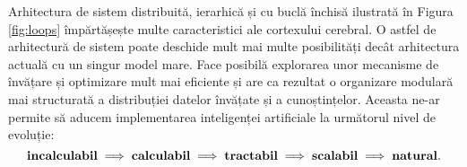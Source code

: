 \documentclass[../../book-main_ro.tex]{subfiles}
\begin{document}
Arhitectura de sistem distribuită, ierarhică și cu buclă închisă ilustrată în Figura \ref{fig:loops} împărtășește multe caracteristici ale cortexului cerebral. O astfel de arhitectură de sistem poate deschide mult mai multe posibilități decât arhitectura actuală cu un singur model mare. Face posibilă explorarea unor mecanisme de învățare și optimizare mult mai eficiente și are ca rezultat o organizare modulară mai structurată a distribuției datelor învățate și a cunoștințelor. Aceasta ne-ar permite să aducem implementarea inteligenței artificiale la următorul nivel de evoluție:
\begin{equation}
   \mbox{\textbf{incalculabil}} \;
   \Longrightarrow \; \mbox{\textbf{calculabil}} \;
   \Longrightarrow \; \mbox{\textbf{tractabil}} \; \Longrightarrow \; 
   \mbox{\textbf{scalabil}} \; \Longrightarrow \; 
   \mbox{\textbf{natural}}.
\end{equation}
\end{document}
